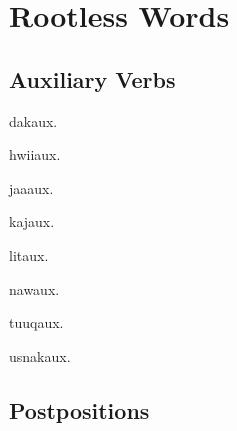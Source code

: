 \chapter{Rootless Words}
\begin{multicols*}{2}
\section{Auxiliary Verbs}
\begin{description}[leftmargin=*]
    \begin{dictentry}{dak}{aux.}
    \end{dictentry}
    \begin{dictentry}{hwii}{aux.}
    \end{dictentry}
    \begin{dictentry}{jaa}{aux.}
    \end{dictentry}
    \begin{dictentry}{kaj}{aux.}
    \end{dictentry}
    \begin{dictentry}{lit}{aux.}
    \end{dictentry}
    \begin{dictentry}{naw}{aux.}
    \end{dictentry}
    \begin{dictentry}{tuuq}{aux.}
    \end{dictentry}
    \begin{dictentry}{usnak}{aux.}
    \end{dictentry}
\end{description}

\section{Postpositions}


\end{multicols*}

